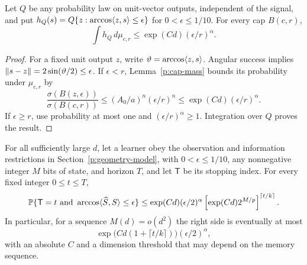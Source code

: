 \begin{lemma}\label{p:cap-terminal}
Let $Q$ be any probability law on unit-vector outputs, independent of
the signal, and put
$h_Q(s)=Q\{z:\arccos\langle z,s\rangle\le\epsilon\}$ for
$0<\epsilon\le1/10$.  For every cap $B(c,r)$,
\begin{equation}\label{p:cap-terminal-bound}
 \int h_Q\,d\mu_{c,r}\le\exp(Cd)(\epsilon/r)^\alpha.
\end{equation}
\end{lemma}

\begin{proof}
For a fixed unit output $z$, write $\vartheta=\arccos\langle z,s\rangle$.
Angular success implies $\left\lVert s-z\right\rVert=2\sin(\vartheta/2)\le\epsilon$.  If
$\epsilon<r$, Lemma~\ref{p:cap-mass} bounds its probability under
$\mu_{c,r}$ by
\[
 \frac{\sigma(B(z,\epsilon))}{\sigma(B(c,r))}
 \le(A_0/a)^n(\epsilon/r)^n
 \le\exp(Cd)(\epsilon/r)^\alpha.
\]
If $\epsilon\ge r$, use probability at most one and
$(\epsilon/r)^\alpha\ge1$.  Integration over $Q$ proves the result.
\end{proof}

\begin{proposition}\label{p:cap-fixed-stop}
For all sufficiently large $d$, let a learner obey the observation and
information restrictions in Section~\ref{p:geometry-model}, with
$0<\epsilon\le1/10$, any nonnegative integer $M$ bits of state, and horizon $T$,
and let $\mathsf T$ be its stopping index.  For every fixed integer
$0\le t\le T$,
\begin{equation}\label{p:cap-fixed-stop-explicit}
 \mathbb P\{\mathsf T=t\text{ and }\arccos\langle \widehat S,S\rangle\le\epsilon\}
 \le\exp(Cd)(\epsilon/2)^\alpha
       \left[\exp(Cd)2^{M/p}\right]^{\lceil t/k\rceil}.
\end{equation}
In particular, for a sequence $M(d)=o(d^2)$ the right side is eventually
at most
\begin{equation}\label{p:cap-fixed-stop-asymptotic}
 \exp\bigl(Cd(1+\lceil t/k\rceil)\bigr)(\epsilon/2)^\alpha,
\end{equation}
with an absolute $C$ and a dimension threshold that may depend on the
memory sequence.
\end{proposition}

